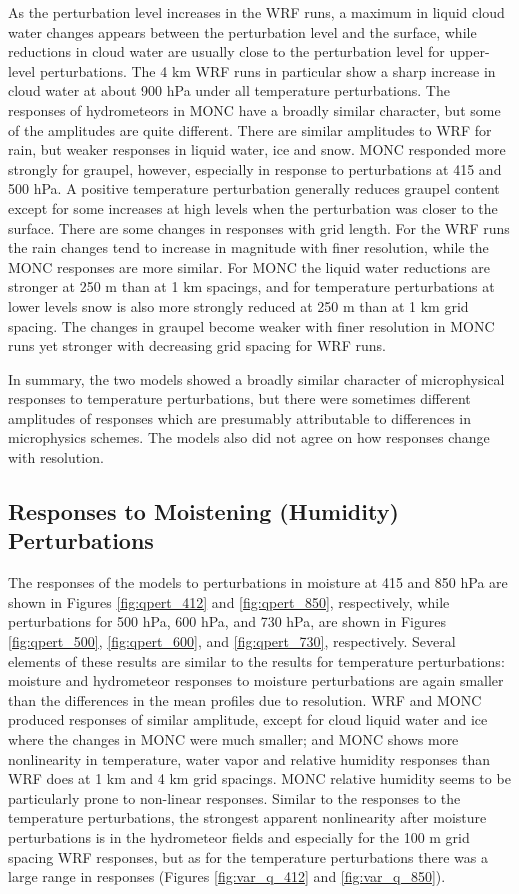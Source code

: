 \documentclass[draft]{agujournal2019}
\begin{document}
As the perturbation level increases in the WRF runs, a maximum in liquid cloud
water changes appears between the perturbation level and the surface, while
reductions in cloud water are usually close to the perturbation level for
upper-level perturbations. The 4 km WRF runs in particular show a sharp increase
in cloud water at about 900 hPa under all temperature perturbations. The
responses of hydrometeors in MONC have a broadly similar character, but some of
the amplitudes are quite different. There are similar amplitudes to WRF for
rain, but weaker responses in liquid water, ice and snow. MONC responded more
strongly for graupel, however, especially in response to perturbations at 415
and 500 hPa. A positive temperature perturbation generally reduces graupel
content except for some increases at high levels when the perturbation was
closer to the surface. There are some changes in responses with grid length. For
the WRF runs the rain changes tend to increase in magnitude with finer
resolution, while the MONC responses are more similar. For MONC the liquid water
reductions are stronger at 250 m than at 1 km spacings, and for temperature
perturbations at lower levels snow is also more strongly reduced at 250 m than
at 1 km grid spacing. The changes in graupel become weaker with finer resolution
in MONC runs yet stronger with decreasing grid spacing for WRF runs. 

In summary, the two models showed a broadly similar character of microphysical
responses to temperature perturbations, but there were sometimes different
amplitudes of responses which are presumably attributable to differences in
microphysics schemes. The models also did not agree on how responses change with
resolution.

\subsection{Responses to Moistening (Humidity) Perturbations}

The responses of the models to perturbations in moisture at 415 and 850 hPa are
shown in Figures \ref{fig:qpert_412} and \ref{fig:qpert_850}, respectively,
while perturbations for 500 hPa, 600 hPa, and 730 hPa, are shown in Figures
\ref{fig:qpert_500}, \ref{fig:qpert_600}, and \ref{fig:qpert_730}, respectively.
Several elements of these results are similar to the results for temperature
perturbations: moisture and hydrometeor responses to moisture perturbations are
again smaller than the differences in the mean profiles due to resolution. WRF
and MONC produced responses of similar amplitude, except for cloud liquid water
and ice where the changes in MONC were much smaller; and MONC shows more
nonlinearity in temperature, water vapor and relative humidity responses than
WRF does at 1 km and 4 km grid spacings. MONC relative humidity seems to be
particularly prone to non-linear responses. Similar to the responses to the
temperature perturbations, the strongest apparent nonlinearity after moisture
perturbations is in the hydrometeor fields and especially for the 100 m grid
spacing WRF responses, but as for the temperature perturbations there was a
large range in responses (Figures \ref{fig:var_q_412} and \ref{fig:var_q_850}).
\end{document}
